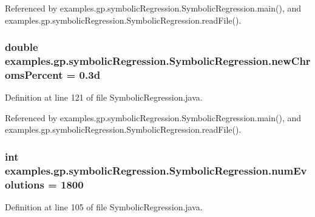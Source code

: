 Referenced by examples.\-gp.\-symbolic\-Regression.\-Symbolic\-Regression.\-main(), and examples.\-gp.\-symbolic\-Regression.\-Symbolic\-Regression.\-read\-File().

\hypertarget{classexamples_1_1gp_1_1symbolic_regression_1_1_symbolic_regression_a0acb20632ed97be899eb5766a2fd7f51}{
\subsubsection[{new\-Chroms\-Percent}]{\setlength{\rightskip}{0pt plus 5cm}double examples.\-gp.\-symbolic\-Regression.\-Symbolic\-Regression.\-new\-Chroms\-Percent = 0.\-3d\hspace{0.3cm}{\ttfamily [static]}}}\label{classexamples_1_1gp_1_1symbolic_regression_1_1_symbolic_regression_a0acb20632ed97be899eb5766a2fd7f51}


Definition at line 121 of file Symbolic\-Regression.\-java.



Referenced by examples.\-gp.\-symbolic\-Regression.\-Symbolic\-Regression.\-main(), and examples.\-gp.\-symbolic\-Regression.\-Symbolic\-Regression.\-read\-File().

\hypertarget{classexamples_1_1gp_1_1symbolic_regression_1_1_symbolic_regression_a24d9df44a21940898dc355631dbc2777}{
\subsubsection[{num\-Evolutions}]{\setlength{\rightskip}{0pt plus 5cm}int examples.\-gp.\-symbolic\-Regression.\-Symbolic\-Regression.\-num\-Evolutions = 1800\hspace{0.3cm}{\ttfamily [static]}}}\label{classexamples_1_1gp_1_1symbolic_regression_1_1_symbolic_regression_a24d9df44a21940898dc355631dbc2777}


Definition at line 105 of file Symbolic\-Regression.\-java.



